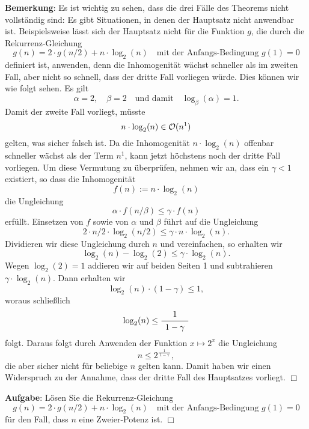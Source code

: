 \noindent
\textbf{Bemerkung}: Es ist wichtig zu sehen, dass die drei F\"alle des Theorems nicht vollst\"andig sind:
Es gibt Situationen, in denen der Hauptsatz nicht anwendbar ist.  Beispielsweise l\"asst sich der Hauptsatz nicht
f\"ur die Funktion $g$, die durch die Rekurrenz-Gleichung
\[ g(n) = 2 \cdot g(n/2) + n \cdot \log_2(n) \quad \mbox{mit der Anfangs-Bedingung $g(1) = 0$}\]
definiert ist, anwenden, denn die Inhomogenit\"at w\"achst schneller als im zweiten Fall, aber
nicht so schnell, dass der dritte Fall vorliegen w\"urde.  Dies k\"onnen wir wie folgt sehen.
Es gilt 
\[ \alpha = 2, \quad \beta = 2 \quad \mbox{und damit} \quad \log_\beta(\alpha) = 1. \]
Damit der zweite Fall vorliegt, m\"usste 
\[ n \cdot \log_2(n) \in \mathcal{O}(n^1) \]
gelten, was sicher falsch ist.  Da die Inhomogenit\"at $n \cdot \log_2(n)$ offenbar
schneller w\"achst als der Term $n^1$, kann jetzt h\"ochstens noch der dritte Fall vorliegen.
Um diese Vermutung zu \"uberpr\"ufen, nehmen wir an, dass ein $\gamma < 1$ existiert, so dass die Inhomogenit\"at 
\[ f(n) := n \cdot \log_2(n) \]
die Ungleichung 
\[ \alpha \cdot f(n/\beta) \leq \gamma \cdot f(n) \]
erf\"ullt.  Einsetzen von $f$ sowie von $\alpha$ und $\beta$ f\"uhrt auf die Ungleichung
\[ 2 \cdot n/2 \cdot \log_2(n/2) \leq \gamma \cdot n \cdot \log_2(n). \]
Dividieren wir diese Ungleichung durch $n$ und vereinfachen, so erhalten wir
\[ \log_2(n) - \log_2(2) \leq \gamma \cdot \log_2(n). \]
Wegen $\log_2(2) = 1$ addieren wir auf beiden Seiten 1 und subtrahieren $\gamma \cdot \log_2(n)$.
Dann erhalten wir
\[ \log_2(n) \cdot (1 - \gamma) \leq 1, \]
woraus schlie{\ss}lich 
\[ \log_2(n) \leq \bruch{1}{\;1 - \gamma\;} \]
folgt.  Daraus folgt durch Anwenden der Funktion $x \mapsto 2^x$ die Ungleichung
\[ \displaystyle n \leq 2^\frac{1}{\;1 - \gamma\;}, \]
die aber sicher nicht f\"ur beliebige $n$ gelten kann.  Damit haben wir einen Widerspruch
zu der Annahme, dass der dritte Fall des Hauptsatzes vorliegt.
\hspace*{\fill} $\Box$
\vspace*{0.3cm}

\noindent
\textbf{Aufgabe}:  L\"osen Sie die Rekurrenz-Gleichung
\[ g(n) = 2 \cdot g(n/2) + n \cdot \log_2(n) \quad \mbox{mit der Anfangs-Bedingung $g(1) = 0$} \]
f\"ur den Fall, dass $n$ eine Zweier-Potenz ist.
\hspace*{\fill} $\Box$


